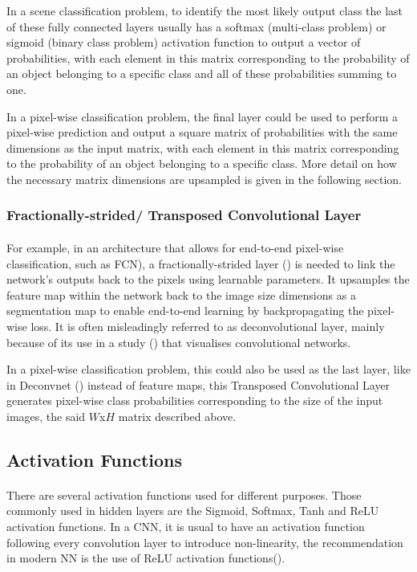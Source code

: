 In a scene classification problem, to identify the most likely output class the last of these fully connected layers usually has a softmax (multi-class problem) or sigmoid (binary class problem) activation function to output a vector of probabilities, with each element in this matrix corresponding to the probability of an object belonging to a specific class and all of these probabilities summing to one.

In a pixel-wise classification problem, the final layer could be used to perform a pixel-wise prediction and output a square matrix of probabilities with the same dimensions as the input matrix, with each element in this matrix corresponding to the probability of an object belonging to a specific class. More detail on how the necessary matrix dimensions are upsampled is given in the following section.

\subsubsection{Fractionally-strided/ Transposed Convolutional Layer}
\paragraph{}
For example, in an architecture that allows for end-to-end pixel-wise classification, such as \gls{FCN}), a fractionally-strided layer (\cite{long2015fully}) is needed to link the network's outputs back to the pixels using learnable parameters. It upsamples the feature map within the network back to the image size dimensions as a segmentation map to enable end-to-end learning by backpropagating the pixel-wise loss. It is often misleadingly referred to as deconvolutional layer, mainly because of its use in a study (\cite{zeiler2013visualizing}) that visualises convolutional networks. 

In a pixel-wise classification problem, this could also be used as the last layer, like in Deconvnet (\cite{7410535}) instead of feature maps, this Transposed Convolutional Layer generates pixel-wise class probabilities corresponding to the size of the input images, the said $W$x$H$ matrix described above.

\subsection{Activation Functions} \label{cnn_activation}
\paragraph{}
There are several activation functions used for different purposes. Those commonly used in hidden layers are the Sigmoid, Softmax, Tanh and \gls{ReLU} activation functions.
In a \gls{CNN}, it is usual to have an activation function following every convolution layer to introduce non-linearity, the recommendation in modern \gls{NN} is the use of \gls{ReLU} activation functions(\cite{GoodBengCour16}).

